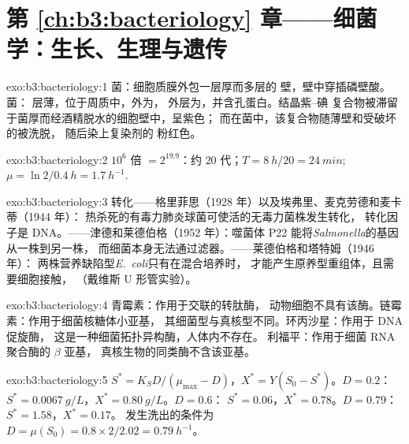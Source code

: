 \section*{第 \ref{ch:b3:bacteriology} 章——细菌学：生长、生理与遗传}

\begin{solution}{exo:b3:bacteriology:1}
菌：细胞质膜外包一层厚而多层的
壁，壁中穿插磷壁酸。菌：
层薄，位于周质中，外为，
外层为，并含孔蛋白。结晶紫–碘
复合物被滞留于菌厚而经酒精脱水的细胞壁中，呈紫色；
而在菌中，该复合物随薄壁和受破坏的被洗脱，
随后染上复染剂的
粉红色。
\end{solution}

\begin{solution}{exo:b3:bacteriology:2}
$10^{6}$ 倍 $= 2^{19.9}$：约 $20$ 代；$T = \qty{8}{h}/20
= \qty{24}{min}$; $\mu = \ln 2/\qty{0.4}{h} = \qty{1.7}{h^{-1}}$.
\end{solution}

\begin{solution}{exo:b3:bacteriology:3}
转化——格里菲思（1928 年）以及埃弗里、麦克劳德和麦卡蒂（1944 年）：
热杀死的有毒力肺炎球菌可使活的无毒力菌株发生转化，
转化因子是 DNA。——津德和莱德伯格（1952 年）：噬菌体 P22
能将\emph{Salmonella}的基因从一株到另一株，
而细菌本身无法通过滤器。——莱德伯格和塔特姆（1946 年）：
两株营养缺陷型\emph{E.~coli}只有在混合培养时，
才能产生原养型重组体，且需要细胞接触，
（戴维斯 U 形管实验）。
\end{solution}

\begin{solution}{exo:b3:bacteriology:4}
青霉素：作用于交联的转肽酶，
动物细胞不具有该酶。链霉素：作用于细菌核糖体小亚基，
其细菌型与真核型不同。环丙沙星：作用于 DNA 促旋酶，
这是一种细菌拓扑异构酶，人体内不存在。
利福平：作用于细菌 RNA 聚合酶的 $\beta$ 亚基，
真核生物的同类酶不含该亚基。
\end{solution}

\begin{solution}{exo:b3:bacteriology:5}
$S^{*} = K_{S}D/(\mu_{\max} - D)$，$X^{*} = Y(S_{0} - S^{*})$。$D = 0.2$：
$S^{*} = \qty{0.0067}{g/L}$，$X^{*} = \qty{0.80}{g/L}$。$D = 0.6$：
$S^{*} = 0.06$，$X^{*} = 0.78$。$D = 0.79$：$S^{*} = 1.58$，$X^{*} = 0.17$。
发生洗出的条件为 $D = \mu(S_{0}) = 0.8\times 2/2.02 = \qty{0.79}{h^{-1}}$。
\end{solution}

